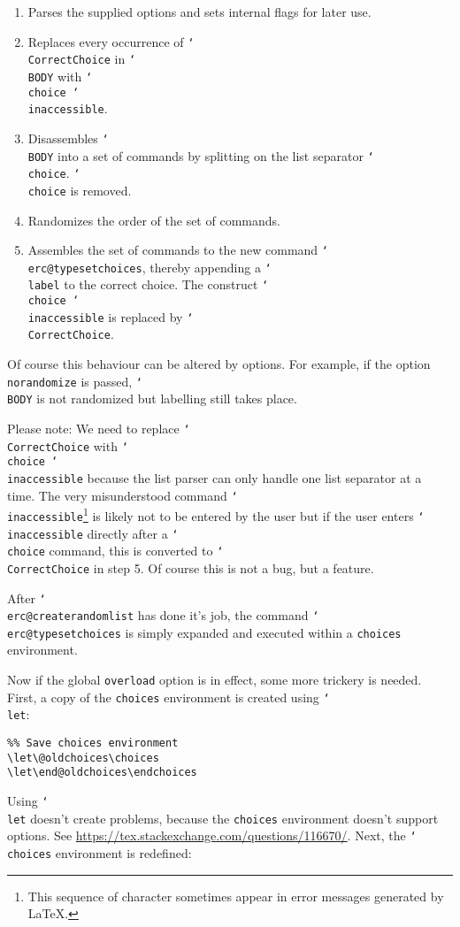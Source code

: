 \documentclass[12pt,a4paper]{exam}
\providecommand{\texorpdfstring}[2]{#1}
\newcommand{\bs}{\texorpdfstring{\char`\\}{}}
\begin{document}
\begin{enumerate}
\item Parses the supplied options and sets internal flags for later use.
\item Replaces every occurrence of \texttt{\bs CorrectChoice} in \texttt{\bs BODY} 
      with \texttt{\bs choice \bs inaccessible}.
\item Disassembles \texttt{\bs BODY} into a set of commands by splitting on the list
      separator \texttt{\bs choice}. \texttt{\bs choice} is removed.
\item Randomizes the order of the set of commands.
\item Assembles the set of commands to the new command \texttt{\bs erc@typesetchoices},
      thereby appending a \texttt{\bs label} to the correct choice. The construct
      \texttt{\bs choice \bs inaccessible} is replaced by \texttt{\bs CorrectChoice}.
\end{enumerate}

Of course this behaviour can be altered by options. For example, if the option
\texttt{norandomize} is passed, \texttt{\bs BODY} is not randomized but labelling still
takes place.

Please note: We need to replace \texttt{\bs CorrectChoice} with \texttt{\bs choice \bs inaccessible}
because the list parser can only handle one list separator at a time. The very misunderstood command
\texttt{\bs inaccessible}\footnote{This sequence of character sometimes appear in error messages
generated by \LaTeX.} is likely not to be entered by the user but if the user enters \texttt{\bs inaccessible}
directly after a \texttt{\bs choice} command, this is converted to \texttt{\bs CorrectChoice}
in step 5. Of course this is not a bug, but a feature.

After \texttt{\bs erc@createrandomlist} has done it's job, the command \texttt{\bs erc@typesetchoices}
is simply expanded and executed within a \texttt{choices} environment.

Now if the global \texttt{overload} option is in effect, some more trickery is needed. First, a copy
of the \texttt{choices} environment is created using \texttt{\bs let}:

\begin{lstlisting}
%% Save choices environment
\let\@oldchoices\choices
\let\end@oldchoices\endchoices
\end{lstlisting}

Using \texttt{\bs let} doesn't create problems, because the \texttt{choices} environment
doesn't support options. See \url{https://tex.stackexchange.com/questions/116670/}.
Next, the \texttt{\bs choices} environment is redefined:
\end{document}

